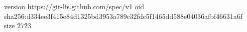 version https://git-lfs.github.com/spec/v1
oid sha256:d334ee3f415e84d1325bd3953a789c32fdc5f1465dd588e04036afbf46631a6f
size 2723

